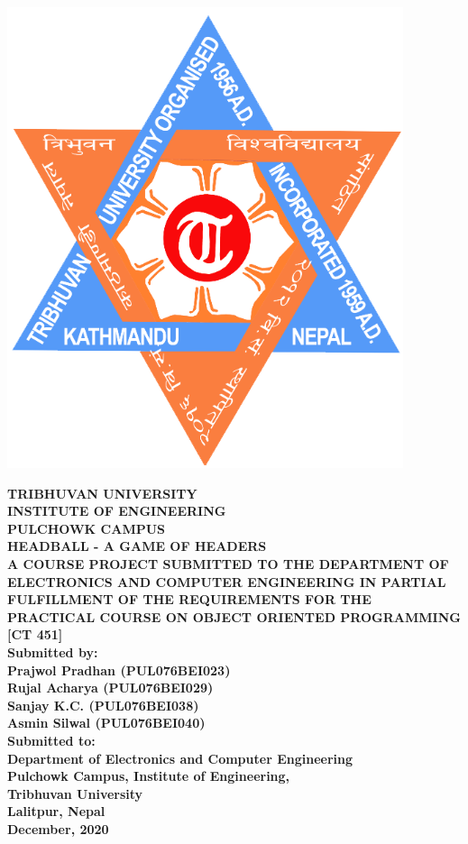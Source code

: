 \documentclass[12pt, final]{report}
\begin{document}
\begin{titlepage}
	\begin{center}

	\includegraphics[scale=0.2]{tu_logo}

\textbf{	TRIBHUVAN UNIVERSITY\\
	INSTITUTE OF ENGINEERING\\
	PULCHOWK CAMPUS}\\
	[2cm]

\textbf{	HEADBALL - A GAME OF HEADERS}\\
	[2cm]

\textbf{	A COURSE PROJECT SUBMITTED TO THE DEPARTMENT OF ELECTRONICS AND COMPUTER ENGINEERING IN PARTIAL FULFILLMENT OF THE REQUIREMENTS FOR THE PRACTICAL COURSE ON OBJECT ORIENTED PROGRAMMING [CT 451]}\\
	[2cm]

\textbf{	Submitted by:\\
	Prajwol Pradhan (PUL076BEI023)\\
	Rujal Acharya (PUL076BEI029)\\
	Sanjay K.C. (PUL076BEI038)\\
	Asmin Silwal (PUL076BEI040)}\\
	[2cm]

\textbf{Submitted to:\\
	Department of Electronics and Computer Engineering\\
	Pulchowk Campus, 	Institute of Engineering,\\ Tribhuvan University\\
	Lalitpur, Nepal}\\
	[2cm]

\textbf{	December, 2020}

	\end{center}
\end{titlepage}
\end{document}
